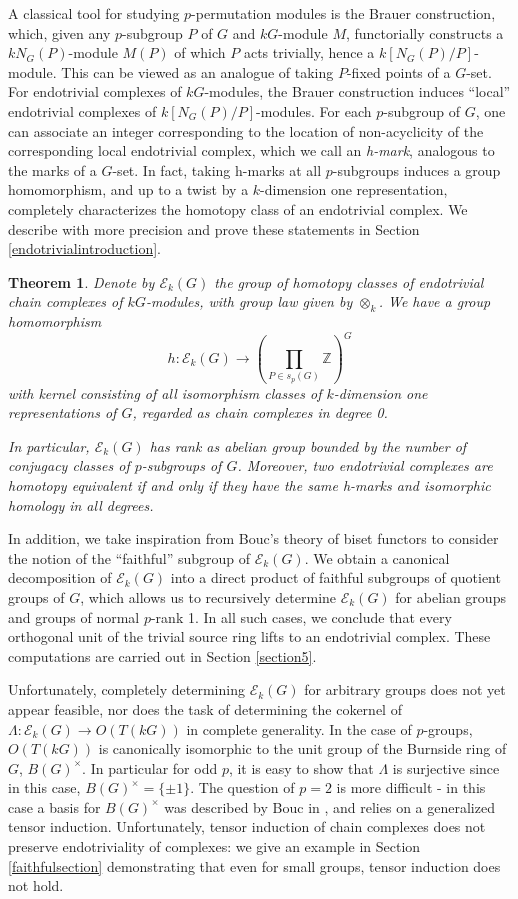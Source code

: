 \documentclass[10pt,letterpaper, boxed, cm]{amsart}
\newcommand{\Z}{\mathbb{Z}}
\newcommand{\calE}{\mathcal{E}}
\newtheorem{theorem}{Theorem}[section]
\theoremstyle{remark}
\theoremstyle{definition}
\begin{document}
	A classical tool for studying $p$-permutation modules is the Brauer construction, which, given any $p$-subgroup $P$ of $G$ and $kG$-module $M$, functorially constructs a $kN_G(P)$-module $M(P)$ of which $P$ acts trivially, hence a $k[N_G(P)/P]$-module. This can be viewed as an analogue of taking $P$-fixed points of a $G$-set. For endotrivial complexes of $kG$-modules, the Brauer construction induces ``local'' endotrivial complexes of $k[N_G(P)/P]$-modules. For each $p$-subgroup of $G$, one can associate an integer corresponding to the location of non-acyclicity of the corresponding local endotrivial complex, which we call an \textit{h-mark}, analogous to the marks of a $G$-set. In fact, taking h-marks at all $p$-subgroups induces a group homomorphism, and up to a twist by a $k$-dimension one representation, completely characterizes the homotopy class of an endotrivial complex. We describe with more precision and prove these statements in Section \ref{endotrivialintroduction}.

	\begin{theorem}
		Denote by $\calE_k(G)$ the group of homotopy classes of endotrivial chain complexes of $kG$-modules, with group law given by $\otimes_k$. We have a group homomorphism \[h: \calE_k(G) \to \left(\prod_{P \in s_p(G)} \Z\right)^G\] with kernel consisting of all isomorphism classes of $k$-dimension one representations of $G$, regarded as chain complexes in degree 0.

		In particular, $\calE_k(G)$ has rank as abelian group bounded by the number of conjugacy classes of $p$-subgroups of $G$. Moreover, two endotrivial complexes are homotopy equivalent if and only if they have the same h-marks and isomorphic homology in all degrees.
	\end{theorem}

	In addition, we take inspiration from Bouc's theory of biset functors to consider the notion of the ``faithful'' subgroup of $\calE_k(G)$. We obtain a canonical decomposition of $\calE_k(G)$ into a direct product of faithful subgroups of quotient groups of $G$, which allows us to recursively determine $\calE_k(G)$ for abelian groups and groups of normal $p$-rank 1. In all such cases, we conclude that every orthogonal unit of the trivial source ring lifts to an endotrivial complex. These computations are carried out in Section \ref{section5}.

	Unfortunately, completely determining $\calE_k(G)$ for arbitrary groups does not yet appear feasible, nor does the task of determining the cokernel of $\Lambda: \calE_k(G) \to O(T(kG))$ in complete generality. In the case of $p$-groups, $O(T(kG))$ is canonically isomorphic to the unit group of the Burnside ring of $G$, $B(G)^\times$. In particular for odd $p$, it is easy to show that $\Lambda$ is surjective since in this case, $B(G)^\times = \{\pm 1\}$. The question of $p = 2$ is more difficult - in this case a basis for $B(G)^\times$ was described by Bouc in \cite[Theorem 7.4]{Bo07}, and relies on a generalized tensor induction. Unfortunately, tensor induction of chain complexes does not preserve endotriviality of complexes: we give an example in Section \ref{faithfulsection} demonstrating that even for small groups, tensor induction does not hold.
\end{document}
